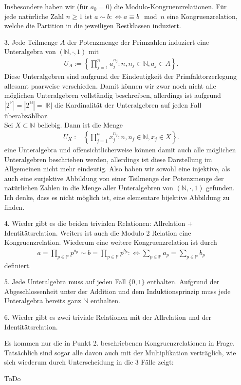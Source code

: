 \begin{solution}
\begin{itemize}
Insbesondere haben wir (für $a_0 = 0$) die Modulo-Kongruenzrelationen. Für jede natürliche Zahl
$n \geq 1$ ist $a \sim b: \iff a \equiv b \mod n$ eine Kongruenzrelation, welche
die Partition in die jeweiligen Restklassen induziert.
\item [3.] Jede Teilmenge $A$ der Potenzmenge der Primzahlen induziert eine
Unteralgebra von $(\mathbb{N},\cdot,1)$ mit
\begin{align*}
  U_A := \left\{\prod_{j=1}^na_j^{n_j}: n, n_j \in \mathbb{N}, a_j \in A\right\}.
\end{align*}
Diese Unteralgebren sind aufgrund der Eindeutigkeit
der Primfaktorzerlegung allesamt paarweise verschieden.
Damit können wir zwar noch nicht alle möglichen Unteralgebren
vollständig beschreiben, allerdings ist aufgrund $|2^\mathbb{P}| = |2^\mathbb{N}|
= |\mathbb{R}|$ die Kardinalität der Unteralgebren auf jeden
Fall überabzählbar. \\
Sei $X \subset \mathbb{N}$ beliebig.
Dann ist die Menge
\begin{align*}
  U_X := \left\{\prod_{j=1}^nx_j^{n_j}: n, n_j \in \mathbb{N}, x_j \in X\right\}.
\end{align*}
eine Unteralgebra und offensichtlicherweise können damit auch alle möglichen
Unteralgebren beschrieben werden, allerdings ist diese Darstellung im Allgemeinen
nicht mehr eindeutig.
Also haben wir sowohl eine injektive, als auch eine surjektive Abbildung von
einer Teilmenge der Potenzmenge der natürlichen Zahlen in die Menge aller
Unteralgebren von $(\mathbb{N},\cdot,1)$ gefunden. \\
Ich denke, dass es nicht möglich ist, eine elementare bijektive Abbildung zu finden.
\item [4.] Wieder gibt es die beiden trivialen Relationen: Allrelation + Identitätsrelation.
Weiters ist auch die Modulo 2 Relation eine Kongruenzrelation.
Wiederum eine weitere Kongruenzrelation ist durch
\begin{align*}
  a = \prod_{p \in \mathbb{P}}p^{a_p} \sim b = \prod_{p \in \mathbb{P}}p^{b_p}: \iff \sum_{p \in \mathbb{P}} a_p = \sum_{p \in \mathbb{P}} b_p
\end{align*}
definiert.
\item [5.] Jede Unteralgebra muss auf jeden Fall $\{0,1\}$ enthalten. Aufgrund
der Abgeschlossenheit unter der Addition und dem Induktionsprinzip
muss jede Unteralgebra bereits ganz $\mathbb{N}$ enthalten.
\item [6.] Wieder gibt es zwei triviale Relationen mit der Allrelation und der
Identitätsrelation.

Es kommen nur die in Punkt 2. beschriebenen Kongruenzrelationen in Frage. Tatsächlich sind sogar alle davon auch mit der Multiplikation verträglich, wie sich wiederum durch Unterscheidung in die 3 Fälle zeigt:

ToDo

\end{itemize}
\end{solution}
